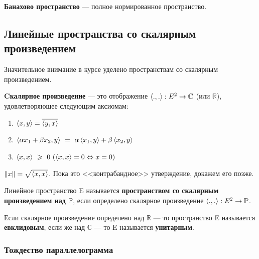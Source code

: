 \documentclass[12pt]{article}
\begin{document}
		\begin{defi}
			\textbf{Банахово пространство} --- полное нормированное пространство.
		\end{defi}
	
	\subsection{Линейные пространства со скалярным произведением}

		Значительное внимание в курсе уделено пространствам со скалярным произведением.

		\begin{defi}
			\textbf{Cкалярное произведение} --- это отображение $\left\langle ., . \right\rangle : E^2 \rightarrow \mathbb{C}$ (или $\mathbb{R}$), удовлетворяющее следующим аксиомам:
			\begin{enumerate}
				\item $\left\langle x, y \right\rangle = \overline{\left\langle y, x \right\rangle}$
				\item $\left\langle \alpha x_1 + \beta x_2, y \right\rangle ~= ~\alpha \left\langle x_1, y \right\rangle + \beta \left\langle x_2, y \right\rangle$
				\item $\left\langle x, x \right\rangle ~\geqslant ~0 ~(\left\langle x, x \right\rangle = 0 \Leftrightarrow x = 0)$
			\end{enumerate}
		\end{defi}

		\begin{defi}
			$\|x\| = \sqrt{\left\langle x, x \right\rangle}$. {\color{gray} Пока это <<контрабандное>> утверждение, докажем его позже.}
		\end{defi}

		\begin{defi}
			Линейное пространство E называется \textbf{пространством со скалярным произведением над $\mathbb{P}$}, если определено скалярное произведение $\left\langle ., . \right\rangle : E^2 \rightarrow \mathbb{P}$.
		\end{defi}

		{\note Если скалярное произведение определено над $\mathbb{R}$ --- то пространство E называется \textbf{евклидовым}, если же над $\mathbb{C}$ --- то E называется \textbf{унитарным}.}

		\subsubsection{Тождество параллелограмма}


\end{document}
